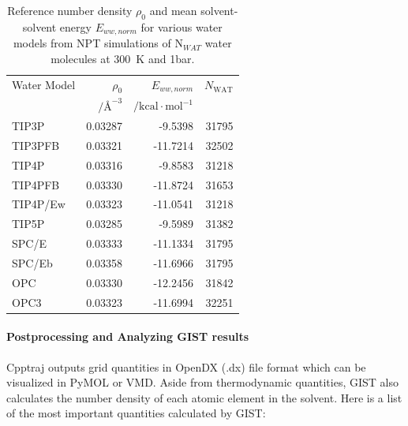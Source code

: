 \documentclass[9pt,tutorial,pubversion]{livecoms}
\begin{document}
\begin{table}[h]

	\caption{Reference number density $\rho_0$ and mean solvent-solvent energy $E_{ww, norm}$ for various water models from NPT simulations of N$_{WAT}$ water molecules at \qty{300}{\kelvin} and 1bar.}
	\label{tab:ref_densities}
	\small
	\begin{tabularx}{\columnwidth}{@{}lrrr@{}}
		\toprule
		Water Model       & $\rho_0$ & $E_{ww, norm}$ & $N_\text{WAT}$ \\
        & $/\text{\AA{}}^{-3}$ & $/\text{kcal}\cdot \text{mol}^{-1}$ & \\
		\midrule
		TIP3P \cite{Jorgensen1983-tip3p}    & 0.03287 & -9.5398   & 31795 \\
		TIP3PFB \cite{Wang2014-tip3p-force-balance}  & 0.03321 & -11.7214  & 32502 \\
		TIP4P \cite{Jorgensen1985-tip4p}    & 0.03316 & -9.8583   & 31218 \\
       TIP4PFB \cite{Wang2014-tip3p-force-balance} & 0.03330 & -11.8724   & 31653 \\
		TIP4P/Ew \cite{Horn2004-tip4pew} & 0.03323 & -11.0541  & 31218 \\
		TIP5P \cite{Mahoney2000-tip5p}    & 0.03285 & -9.5989   & 31382 \\
		SPC/E \cite{Berendsen1987-spce}    & 0.03333 & -11.1334  & 31795 \\
       SPC/Eb \cite{Takemura2012-spceb}   & 0.03358 & -11.6966 & 31795 \\
		OPC \cite{Izadi2014-opc}      & 0.03330 & -12.2456 & 31842 \\
		OPC3 \cite{Izadi2016-opc3}     & 0.03323 & -11.6994 & 32251 \\
		\bottomrule
	\end{tabularx}
\end{table}

\paragraph{Postprocessing and Analyzing GIST results}
Cpptraj outputs grid quantities in OpenDX (.dx) file format which can be visualized in PyMOL or VMD.
Aside from thermodynamic quantities, GIST also calculates the number density of each atomic element in the solvent.
Here is a list of the most important quantities calculated by GIST:
\end{document}

